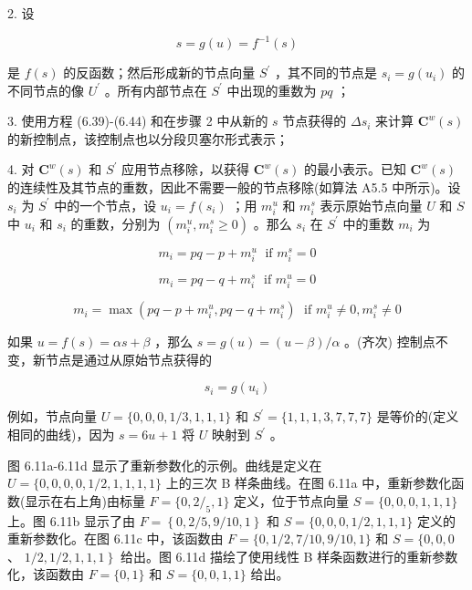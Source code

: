 \documentclass[../main.tex]{subfiles}
\begin{document}
2. 设

\[
s = g\left( u\right)  = {f}^{-1}\left( s\right)  \tag{6.51}
\]

是 \(f\left( s\right)\) 的反函数；然后形成新的节点向量 \({S}^{\prime }\) ，其不同的节点是 \({s}_{i} = g\left( {u}_{i}\right)\) 的不同节点的像 \({U}^{\prime }\) 。所有内部节点在 \({S}^{\prime }\) 中出现的重数为 \({pq}\) ；

3. 使用方程 (6.39)-(6.44) 和在步骤 2 中从新的 \(s\) 节点获得的 \(\Delta {s}_{i}\) 来计算 \({\mathbf{C}}^{w}\left( s\right)\) 的新控制点，该控制点也以分段贝塞尔形式表示；

4. 对 \({\mathbf{C}}^{w}\left( s\right)\) 和 \({S}^{\prime }\) 应用节点移除，以获得 \({\mathbf{C}}^{w}\left( s\right)\) 的最小表示。已知 \({\mathbf{C}}^{w}\left( s\right)\) 的连续性及其节点的重数，因此不需要一般的节点移除(如算法 A5.5 中所示)。设 \({s}_{i}\) 为 \({S}^{\prime }\) 中的一个节点，设 \({u}_{i} = f\left( {s}_{i}\right)\) ；用 \({m}_{i}^{u}\) 和 \({m}_{i}^{s}\) 表示原始节点向量 \(U\) 和 \(S\) 中 \({u}_{i}\) 和 \({s}_{i}\) 的重数，分别为 \(\left( {{m}_{i}^{u},{m}_{i}^{s} \geq  0}\right)\) 。那么 \({s}_{i}\) 在 \({S}^{\prime }\) 中的重数 \({m}_{i}\) 为

\[
{m}_{i} = {pq} - p + {m}_{i}^{u}\;\text{ if }{m}_{i}^{s} = 0
\]

\[
{m}_{i} = {pq} - q + {m}_{i}^{s}\;\text{ if }{m}_{i}^{u} = 0
\]

\[
{m}_{i} = \max \left( {{pq} - p + {m}_{i}^{u},{pq} - q + {m}_{i}^{s}}\right) \;\text{ if }{m}_{i}^{u} \neq  0,{m}_{i}^{s} \neq  0 \tag{6.52}
\]

如果 \(u = f\left( s\right)  = {\alpha s} + \beta\) ，那么 \(s = g\left( u\right)  = \left( {u - \beta }\right) /\alpha\) 。(齐次) 控制点不变，新节点是通过从原始节点获得的

\[
{s}_{i} = g\left( {u}_{i}\right)  \tag{6.53}
\]

例如，节点向量 \(U = \{ 0,0,0,1/3,1,1,1\}\) 和 \({S}^{\prime } = \{ 1,1,1,3,7,7,7\}\) 是等价的(定义相同的曲线)，因为 \(s = {6u} + 1\) 将 \(U\) 映射到 \({S}^{\prime }\) 。

图 6.11a-6.11d 显示了重新参数化的示例。曲线是定义在 \(U = \{ 0,0,0,0,1/2,1,1,1,1\}\) 上的三次 B 样条曲线。在图 6.11a 中，重新参数化函数(显示在右上角)由标量 \(F = \{ 0,2{/}_{5},1\}\) 定义，位于节点向量 \(S = \{ 0,0,0,1,1,1\}\) 上。图 6.11b 显示了由 \(F = \left\{  {0,2/5,9/{10},1}\right\}\) 和 \(S = \{ 0,0,0,1/2,1,1,1\}\) 定义的重新参数化。在图 6.11c 中，该函数由 \(F = \{ 0,1/2,7/{10},9/{10},1\}\) 和 \(S = \{ 0,0,0\) 、 \(\left. {1/2,1/2,1,1,1}\right\}\) 给出。图 6.11d 描绘了使用线性 B 样条函数进行的重新参数化，该函数由 \(F = \{ 0,1\}\) 和 \(S = \{ 0,0,1,1\}\) 给出。
\end{document}
